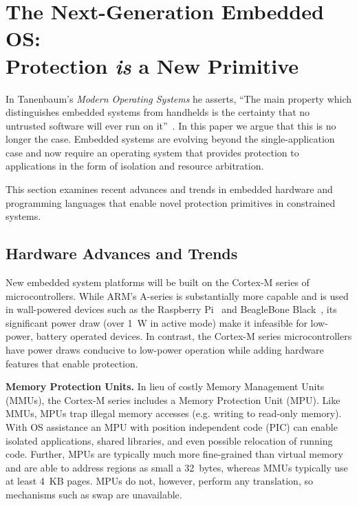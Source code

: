 \section{The Next-Generation Embedded OS:\\Protection \emph{is} a New Primitive}
\label{protection}

In Tanenbaum's \emph{Modern Operating Systems} he asserts, ``The main property
which distinguishes embedded systems from handhelds is the certainty that no
untrusted software will ever run on it''~\cite{tanenbaum}. In this paper we
argue that this is no longer the case. Embedded systems are evolving beyond the
single-application case and now require an operating system that provides
protection to applications in the form of isolation and resource arbitration.

This section examines recent advances and trends in embedded hardware and
programming languages that enable novel protection primitives in constrained
systems.


%
%

\subsection{Hardware Advances and Trends}

New embedded system platforms will be built on the Cortex-M series of microcontrollers.
While ARM's A-series is substantially more capable and is used in wall-powered
devices such as the Raspberry Pi~\cite{rpi} and BeagleBone Black~\cite{bbb},
its significant power draw (over 1~W in active mode) make it infeasible for
low-power, battery operated devices.
In contrast, the Cortex-M series microcontrollers have power draws conducive
to low-power operation while adding hardware features that enable protection.



{\bf Memory Protection Units.}
In lieu of costly Memory Management Units (MMUs), the Cortex-M series includes
a Memory Protection Unit (MPU). Like MMUs, MPUs trap illegal memory accesses
(e.g. writing to read-only memory).
With OS assistance an MPU
with position independent code (PIC) can enable isolated applications, shared
libraries, and even possible relocation of running code.
Further, MPUs are typically much more fine-grained than
virtual memory and are able to address regions as small a 32~bytes, whereas MMUs
typically use at least 4~KB pages.
MPUs do not, however, perform any translation, so mechanisms such as swap are unavailable.

